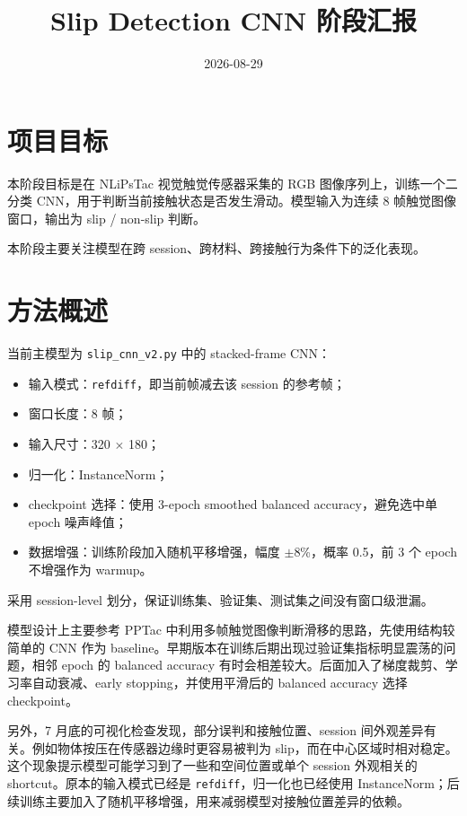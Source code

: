 \documentclass[UTF8,a4paper,11pt]{ctexart}
\title{Slip Detection CNN 阶段汇报}
\author{}
\date{2026-08-29}
\begin{document}
\maketitle

\section{项目目标}

本阶段目标是在 NLiPsTac 视觉触觉传感器采集的 RGB 图像序列上，训练一个二分类 CNN，用于判断当前接触状态是否发生滑动。模型输入为连续 8 帧触觉图像窗口，输出为 slip / non-slip 判断。

本阶段主要关注模型在跨 session、跨材料、跨接触行为条件下的泛化表现。

\section{方法概述}

当前主模型为 \texttt{slip\_cnn\_v2.py} 中的 stacked-frame CNN：

\begin{itemize}
  \item 输入模式：\texttt{refdiff}，即当前帧减去该 session 的参考帧；
  \item 窗口长度：8 帧；
  \item 输入尺寸：320 $\times$ 180；
  \item 归一化：InstanceNorm；
  \item checkpoint 选择：使用 3-epoch smoothed balanced accuracy，避免选中单 epoch 噪声峰值；
  \item 数据增强：训练阶段加入随机平移增强，幅度 $\pm$8\%，概率 0.5，前 3 个 epoch 不增强作为 warmup。
\end{itemize}

采用 session-level 划分，保证训练集、验证集、测试集之间没有窗口级泄漏。

模型设计上主要参考 PPTac 中利用多帧触觉图像判断滑移的思路，先使用结构较简单的 CNN 作为 baseline。早期版本在训练后期出现过验证集指标明显震荡的问题，相邻 epoch 的 balanced accuracy 有时会相差较大。后面加入了梯度裁剪、学习率自动衰减、early stopping，并使用平滑后的 balanced accuracy 选择 checkpoint。

另外，7 月底的可视化检查发现，部分误判和接触位置、session 间外观差异有关。例如物体按压在传感器边缘时更容易被判为 slip，而在中心区域时相对稳定。这个现象提示模型可能学习到了一些和空间位置或单个 session 外观相关的 shortcut。原本的输入模式已经是 \texttt{refdiff}，归一化也已经使用 InstanceNorm；后续训练主要加入了随机平移增强，用来减弱模型对接触位置差异的依赖。
\end{document}
